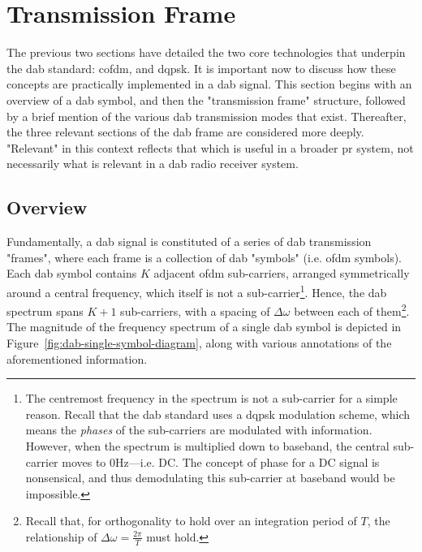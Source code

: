 \documentclass[class=report,11pt,crop=false]{standalone}
\begin{document}
\section{Transmission Frame}
The previous two sections have detailed the two core technologies that underpin the \gls{dab} standard: \gls{cofdm}, and \gls{dqpsk}. It is important now to discuss how these concepts are practically implemented in a \gls{dab} signal. This section begins with an overview of a \gls{dab} symbol, and then the "transmission frame" structure, followed by a brief mention of the various \gls{dab} transmission modes that exist. Thereafter, the three relevant sections of the \gls{dab} frame are considered more deeply. "Relevant" in this context reflects that which is useful in a broader \gls{pr} system, not necessarily what is relevant in a \gls{dab} radio receiver system.

\subsection{Overview}
Fundamentally, a \gls{dab} signal is constituted of a series of \gls{dab} transmission "frames", where each frame is a collection of \gls{dab} "symbols" (i.e. \gls{ofdm} symbols). Each \gls{dab} symbol contains \(K\) adjacent \gls{ofdm} sub-carriers, arranged symmetrically around a central frequency, which itself is not a sub-carrier\footnote{The centremost frequency in the spectrum is not a sub-carrier for a simple reason. Recall that the \gls{dab} standard uses a \gls{dqpsk} modulation scheme, which means the \emph{phases} of the sub-carriers are modulated with information. However, when the spectrum is multiplied down to baseband, the central sub-carrier moves to \(0\si{\hertz}\)---i.e. DC. The concept of phase for a DC signal is nonsensical, and thus demodulating this sub-carrier at baseband would be impossible.}. Hence, the \gls{dab} spectrum spans \(K+1\) sub-carriers, with a spacing of \(\Delta\omega\) between each of them\footnote{Recall that, for orthogonality to hold over an integration period of \(T\), the relationship of  \(\Delta\omega = \frac{2\pi}{T}\) must hold.}. The magnitude of the frequency spectrum of a single \gls{dab} symbol is depicted in Figure~\ref{fig:dab-single-symbol-diagram}, along with various annotations of the aforementioned information.
\end{document}

